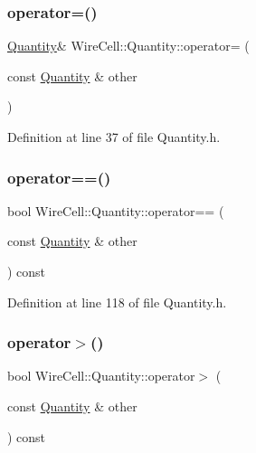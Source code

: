 \subsubsection{\texorpdfstring{operator=()}{operator=()}}
{\footnotesize\ttfamily \hyperlink{class_wire_cell_1_1_quantity}{Quantity}\& Wire\+Cell\+::\+Quantity\+::operator= (\begin{DoxyParamCaption}\item[{const \hyperlink{class_wire_cell_1_1_quantity}{Quantity} \&}]{other }\end{DoxyParamCaption})\hspace{0.3cm}{\ttfamily [inline]}}



Definition at line 37 of file Quantity.\+h.

\mbox{\label{class_wire_cell_1_1_quantity_a9d01b13091aac93b2cd94ec407ed7eca}} 
\subsubsection{\texorpdfstring{operator==()}{operator==()}}
{\footnotesize\ttfamily bool Wire\+Cell\+::\+Quantity\+::operator== (\begin{DoxyParamCaption}\item[{const \hyperlink{class_wire_cell_1_1_quantity}{Quantity} \&}]{other }\end{DoxyParamCaption}) const\hspace{0.3cm}{\ttfamily [inline]}}



Definition at line 118 of file Quantity.\+h.

\mbox{\label{class_wire_cell_1_1_quantity_a9b0b6526e30994779e66e602d27ceb28}} 
\subsubsection{\texorpdfstring{operator$>$()}{operator>()}}
{\footnotesize\ttfamily bool Wire\+Cell\+::\+Quantity\+::operator$>$ (\begin{DoxyParamCaption}\item[{const \hyperlink{class_wire_cell_1_1_quantity}{Quantity} \&}]{other }\end{DoxyParamCaption}) const\hspace{0.3cm}{\ttfamily [inline]}}



